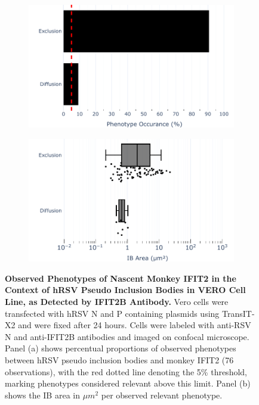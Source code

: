 \begin{figure}
    \begin{subfigure}{0.495\textwidth}
        \caption{}
        \includegraphics[width=1\linewidth]{09. Chapter 4/Figs/02. pIB/03. IFIT2B/04. bar_i2b_vero_hnhp.pdf} 
    \end{subfigure}
    \begin{subfigure}{0.495\textwidth}
        \caption{}
        \includegraphics[width=1\linewidth]{09. Chapter 4/Figs/02. pIB/03. IFIT2B/05. box_i2b_vero_hnhp.pdf}
    \end{subfigure}
    \caption[Observed Phenotypes of Nascent Monkey IFIT2 in the Context of hRSV Pseudo Inclusion Bodies in VERO Cell Line, as Detected by IFIT2B Antibody.]{\textbf{Observed Phenotypes of Nascent Monkey IFIT2 in the Context of hRSV Pseudo Inclusion Bodies in VERO Cell Line, as Detected by IFIT2B Antibody.} Vero cells were transfected with hRSV N and P containing plasmids using TransIT-X2 and were fixed after 24 hours. Cells were labeled with anti-RSV N and anti-IFIT2B antibodies and imaged on confocal microscope. Panel (a) shows percentual proportions of observed phenotypes between hRSV pseudo inclusion bodies and monkey IFIT2 (76 observations), with the red dotted line denoting the 5\% threshold, marking phenotypes considered relevant above this limit. Panel (b) shows the IB area in \(\mu m^2\) per observed relevant phenotype.}
    \label{fig:Observed Phenotypes of Nascent Monkey IFIT2 in the Context of hRSV Pseudo Inclusion Bodies in VERO Cell Line, as Detected by IFIT2B Antibody}
\end{figure}

